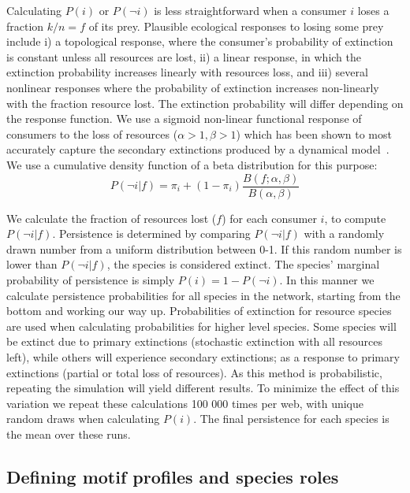 \documentclass[12pt]{article}
\begin{document}
\begin{spacing}{2.0}
		Calculating $P(i)$ or $P(\lnot i)$ is less straightforward when a consumer $i$ loses a fraction $k/n = f$ of its prey. 
		Plausible ecological responses to losing some prey include i) a topological response, where the consumer's probability of extinction is constant unless all resources are lost, ii) a linear response, in which the extinction probability increases linearly with resources loss, and iii) several nonlinear responses where the probability of extinction increases non-linearly with the fraction resource lost. 
		The extinction probability will differ depending on the response function. 
		We use a sigmoid non-linear functional response of consumers to the loss of resources ($\alpha >1, \beta >1$) which has been shown to most accurately capture the secondary extinctions produced by a dynamical model~\citep{Eklof2013}. 
		We use a cumulative density function of a beta distribution for this purpose:
		\begin{equation}
		\label{betafunc}
		P(\lnot i|f) = \pi_{i} + (1 - \pi_{i}) \frac{B(f;\alpha,\beta)}{B(\alpha,\beta)}
		\end{equation}

		We calculate the fraction of resources lost ($f$) for each consumer $i$, to compute $P(\lnot i|f)$. 
		Persistence is determined by comparing $P(\lnot i|f)$ with a randomly drawn number from a uniform distribution between 0-1. 
		If this random number is lower than $P(\lnot i|f)$, the species is considered extinct. 
		The species' marginal probability of persistence is simply $P(i) = 1-P(\lnot i)$.
		In this manner we calculate persistence probabilities for all species in the network, starting from the bottom and working our way up. 
		Probabilities of extinction for resource species are used when calculating probabilities for higher level species. 
		Some species will be extinct due to primary extinctions (stochastic extinction with all resources left), while others will experience secondary extinctions; as a response to primary extinctions (partial or total loss of resources). 
		As this method is probabilistic, repeating the simulation will yield different results. 
		To minimize the effect of this variation we repeat these calculations 100 000 times per web, with unique random draws when calculating $P(i)$.
		The final persistence for each species is the mean over these runs. 

	\subsection*{Defining motif profiles and species roles}


\end{spacing}
\end{document}
